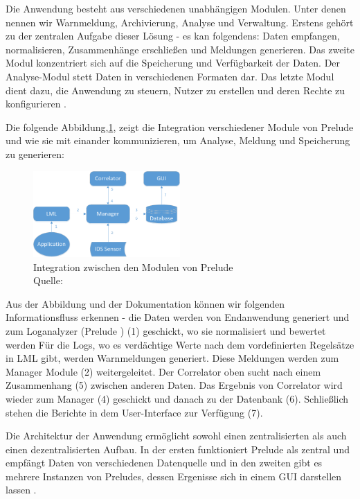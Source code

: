 Die Anwendung besteht aus verschiedenen unabhängigen Modulen. Unter denen nennen wir Warnmeldung, Archivierung, Analyse und Verwaltung. Erstens gehört zu der zentralen Aufgabe dieser Lösung - es kan folgendens: Daten empfangen, normalisieren, Zusammenhänge erschließen und Meldungen generieren. Das zweite Modul  konzentriert sich auf die Speicherung und Verfügbarkeit der Daten. Der Analyse-Modul stett Daten in verschiedenen Formaten dar. Das letzte Modul dient dazu, die Anwendung zu steuern, Nutzer zu erstellen und deren Rechte zu konfigurieren \citep{EC_Prelude}. 

\newpage
Die folgende Abbildung,\ref{fig:Module_preludes}, zeigt die Integration verschiedener Module von Prelude und wie sie mit einander kommunizieren, um Analyse, Meldung und Speicherung zu generieren:

\begin{figure}[H]
   \centering
   \includegraphics[width=0.5\textwidth]{assets/2_p3.png}
   \caption[Integration zwischen den Modulen von Prelude ]
   {Integration zwischen den Modulen von Prelude \\Quelle: \citep{Prelude_MU} }
   \label{fig:Module_preludes}
   \centering
\end{figure}

Aus der Abbildung und der Dokumentation können wir folgenden Informationsfluss erkennen - die Daten werden von Endanwendung generiert und zum Loganalyzer (Prelude ) (1) geschickt, wo sie normalisiert und bewertet werden Für die Logs, wo es verdächtige Werte nach dem vordefinierten Regelsätze in \gls{LML} gibt, werden Warnmeldungen generiert. Diese Meldungen werden zum Manager Module (2) weitergeleitet. Der Correlator oben sucht nach einem Zusammenhang (5) zwischen anderen Daten. Das Ergebnis von Correlator wird wieder zum Manager (4) geschickt und danach zu der Datenbank (6). Schließlich stehen die Berichte in dem User-Interface zur Verfügung (7)\citep{Prelude_Doc}.

Die Architektur der Anwendung ermöglicht sowohl einen zentralisierten als auch einen dezentralisierten Aufbau. In der ersten funktioniert Prelude als zentral und empfängt Daten von verschiedenen Datenquelle und in den zweiten gibt es mehrere Instanzen von Preludes, dessen Ergenisse sich in einem \gls{GUI} darstellen lassen \citep{Prelude_MU}. 

